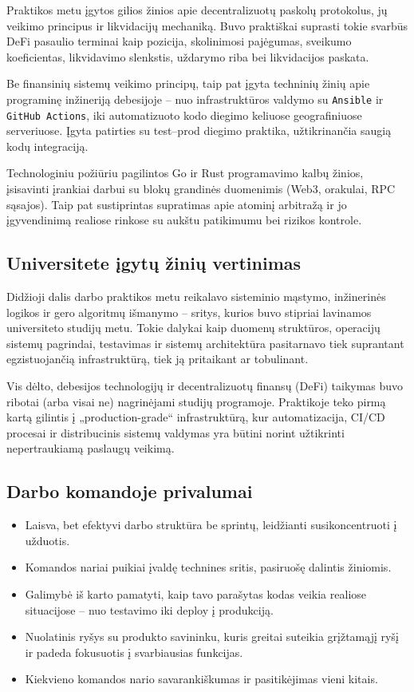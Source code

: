 \documentclass[]{VUMIFTemplateClass}
\begin{document}
Praktikos metu įgytos gilios žinios apie decentralizuotų paskolų protokolus, jų veikimo principus ir likvidacijų mechaniką. Buvo praktiškai suprasti tokie svarbūs DeFi pasaulio terminai kaip pozicija, skolinimosi pajėgumas, sveikumo koeficientas, likvidavimo slenkstis, uždarymo riba bei likvidacijos paskata.

Be finansinių sistemų veikimo principų, taip pat įgyta techninių žinių apie programinę inžineriją debesijoje – nuo infrastruktūros valdymo su \texttt{Ansible} ir \texttt{GitHub Actions}, iki automatizuoto kodo diegimo keliuose geografiniuose serveriuose. Įgyta patirties su test–prod diegimo praktika, užtikrinančia saugią kodų integraciją.

Technologiniu požiūriu pagilintos Go ir Rust programavimo kalbų žinios, įsisavinti įrankiai darbui su blokų grandinės duomenimis (Web3, orakulai, RPC sąsajos). Taip pat sustiprintas supratimas apie atominį arbitražą ir jo įgyvendinimą realiose rinkose su aukštu patikimumu bei rizikos kontrole.

\subsection{Universitete įgytų žinių vertinimas}

Didžioji dalis darbo praktikos metu reikalavo sisteminio mąstymo, inžinerinės logikos ir gero algoritmų išmanymo – sritys, kurios buvo stipriai lavinamos universiteto studijų metu. Tokie dalykai kaip duomenų struktūros, operacijų sistemų pagrindai, testavimas ir sistemų architektūra pasitarnavo tiek suprantant egzistuojančią infrastruktūrą, tiek ją pritaikant ar tobulinant.

Vis dėlto, debesijos technologijų ir decentralizuotų finansų (DeFi) taikymas buvo ribotai (arba visai ne) nagrinėjami studijų programoje. Praktikoje teko pirmą kartą gilintis į „production-grade“ infrastruktūrą, kur automatizacija, CI/CD procesai ir distribucinis sistemų valdymas yra būtini norint užtikrinti nepertraukiamą paslaugų veikimą.

\subsection{Darbo komandoje privalumai}

\begin{itemize}
    \item Laisva, bet efektyvi darbo struktūra be sprintų, leidžianti susikoncentruoti į užduotis.
    \item Komandos nariai puikiai įvaldę technines sritis, pasiruošę dalintis žiniomis.
    \item Galimybė iš karto pamatyti, kaip tavo parašytas kodas veikia realiose situacijose – nuo testavimo iki deploy į produkciją.
    \item Nuolatinis ryšys su produkto savininku, kuris greitai suteikia grįžtamąjį ryšį ir padeda fokusuotis į svarbiausias funkcijas.
    \item Kiekvieno komandos nario savarankiškumas ir pasitikėjimas vieni kitais.
\end{itemize}
\end{document}
